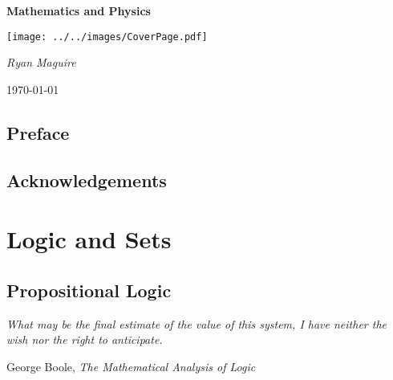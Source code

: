 \documentclass{book}                                                           %
\begin{document}
    \pagecolor{CoverPage}
    \begin{titlepage}
        \centering
        \LARGE{\bfseries{Mathematics and Physics}}
        \par\vspace{3.5cm}
        \texttt{[image: ../../images/CoverPage.pdf]}
        \par\vspace{4cm}
        \Large{\itshape{Ryan Maguire}}
        \par\vspace{1.5ex}
        \normalsize{\today}
    \end{titlepage}
    \nopagecolor
    \tableofcontents
    \listoffigures
    \listoftables
    \clearpage
    \chapter*{Preface}
        
    \clearpage
    \chapter*{Acknowledgements}
        
    \clearpage
        \renewcommand{\TOPPATH}{foundations}
        \label{book:Foundations}%
        \renewcommand{\PARPATH}{\TOPPATH/logic_and_sets}
        \part{Logic and Sets}
            \chapter{Propositional Logic}
                \hfill
                \begin{minipage}[b]{0.7\textwidth}
                    \itshape
                    What may be the final estimate of the value of this
                    system, I have neither the wish nor the right to
                    anticipate.
                    \par\hfill\par
                    \hfill
                    \normalfont
                    George Boole,
                    \itshape
                    The Mathematical Analysis of Logic
                \end{minipage}
                \par\hfill\par
                \renewcommand{\PATH}{\PARPATH/propositional_logic}
                \label{chapt:Propositional_Logic}%
                
                
\end{document}
